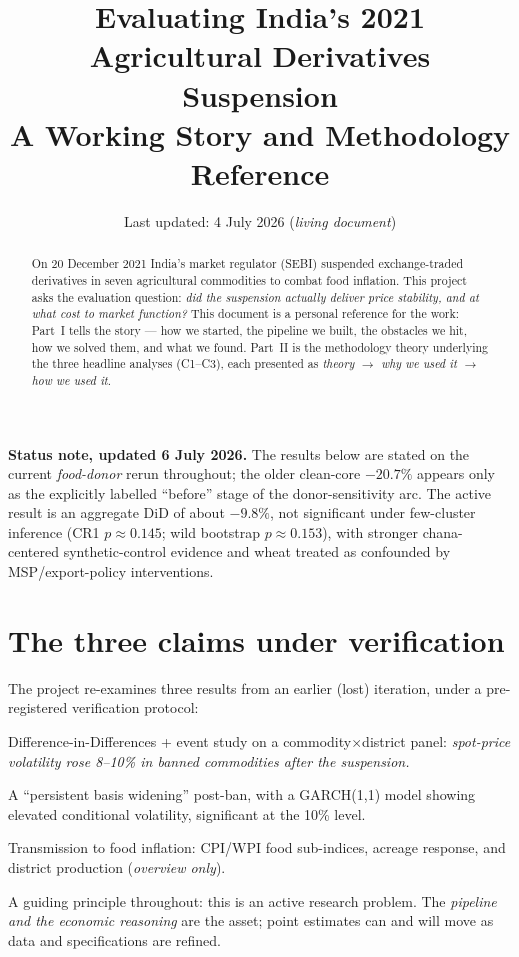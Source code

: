 \documentclass[11pt]{article}
\title{\textbf{Evaluating India's 2021 Agricultural Derivatives Suspension}\\[4pt]
\large A Working Story and Methodology Reference}
\author{}
\date{Last updated: 4 July 2026 \quad(\emph{living document})}
\begin{document}
\maketitle

\noindent\textbf{Status note, updated 6 July 2026.} The results below are stated on the
current \emph{food-donor} rerun throughout; the older clean-core $-20.7\%$ appears only as
the explicitly labelled ``before'' stage of the donor-sensitivity arc. The active result is an aggregate DiD of about $-9.8\%$,
not significant under few-cluster inference (CR1 $p \approx 0.145$; wild bootstrap
$p \approx 0.153$), with stronger chana-centered synthetic-control evidence and
wheat treated as confounded by MSP/export-policy interventions.

\begin{abstract}
\noindent On 20 December 2021 India's market regulator (SEBI) suspended exchange-traded
derivatives in seven agricultural commodities to combat food inflation. This project asks
the evaluation question: \emph{did the suspension actually deliver price stability, and at
what cost to market function?} This document is a personal reference for the work: Part~I
tells the story --- how we started, the pipeline we built, the obstacles we hit, how we
solved them, and what we found. Part~II is the methodology theory underlying the three
headline analyses (C1--C3), each presented as \emph{theory $\rightarrow$ why we used it
$\rightarrow$ how we used it}.
\end{abstract}

\tableofcontents
\bigskip

\section*{The three claims under verification}
The project re-examines three results from an earlier (lost) iteration, under a
pre-registered verification protocol:
\begin{description}[leftmargin=2.2em]
  \item[\textbf{C1}] Difference-in-Differences + event study on a commodity$\times$district
        panel: \emph{spot-price volatility rose 8--10\% in banned commodities after the
        suspension.}
  \item[\textbf{C2}] A ``persistent basis widening'' post-ban, with a GARCH(1,1) model
        showing elevated conditional volatility, significant at the 10\% level.
  \item[\textbf{C3}] Transmission to food inflation: CPI/WPI food sub-indices, acreage
        response, and district production (\emph{overview only}).
\end{description}
A guiding principle throughout: this is an active research problem. The \emph{pipeline and
the economic reasoning} are the asset; point estimates can and will move as data and
specifications are refined.
\end{document}
